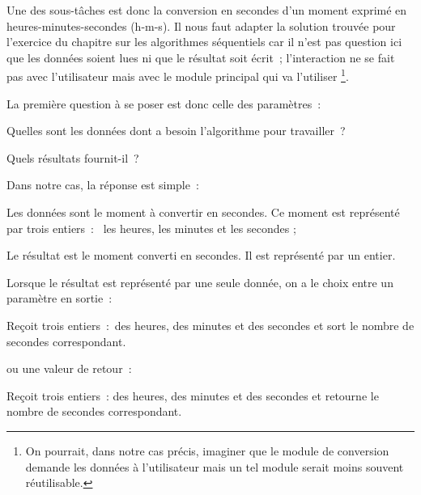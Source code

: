 		Une des sous-tâches est donc la conversion en secondes
		d’un moment exprimé en heures-minutes-secondes
		(h-m-s). Il nous faut adapter la solution trouvée pour
		l’exercice du chapitre sur les algorithmes séquentiels
		car il n’est pas question ici que les données soient
		lues ni que le résultat soit écrit~; l’interaction ne
		se fait pas avec l’utilisateur mais avec le module
		principal qui va l’utiliser%
		\footnote{%
			On pourrait, dans notre cas précis, 
			imaginer que le module de conversion demande les données 
			à l’utilisateur mais un tel module serait
			moins souvent réutilisable.
		}.
	
		La première question à se poser est donc celle des paramètres~:
	
		\begin{liste}
		\item 
			Quelles sont les données dont a besoin l’algorithme
			pour travailler~?
		\item 
			Quels résultats fournit-il~?
		\end{liste}
	
		Dans notre cas, la réponse est simple~:
	
		\begin{liste}
		\item
			Les données sont le moment à convertir en secondes. 
			Ce moment est représenté par trois entiers~:~
			les heures, les minutes et les secondes ;
		\item
			Le résultat est le moment converti en secondes. 
			Il est représenté par un entier.
		\end{liste}
	
		Lorsque le résultat est représenté par une seule donnée, 
		on a le choix entre un paramètre en sortie~:
	
		\begin{Pseudocode}
			\LComment Reçoit trois entiers~:~des heures, des minutes et des secondes 
			\LComment et sort le nombre de secondes correspondant.
		\end{Pseudocode}
		
		ou une valeur de retour~:
	
		\begin{Pseudocode}
			\LComment Reçoit trois entiers~: des heures, des minutes et des secondes 
			\LComment et retourne le nombre de secondes correspondant.
			\ModuleSign{hmsVersSec}{h\In, m\In, s\In~: entiers}{entier}
		\end{Pseudocode}
	
